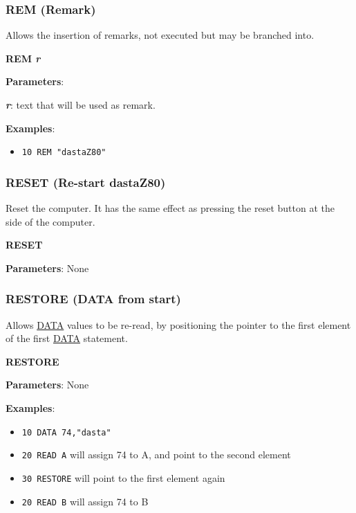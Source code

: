     \subsubsection{{REM (Remark)}}
    \label{msbasic:lang:rem}
    Allows the insertion of remarks, not executed but may be branched into.

    \hspace{1.9cm}\textbf{REM \textit{r}}

    \textbf{Parameters}:

    \hspace{1cm}\textbf{\textit{r}}: text that will be used as remark.

    \textbf{Examples}:
    \begin{itemize}
        \item \texttt{10 REM "dastaZ80"}
    \end{itemize}

    \subsubsection{{RESET (Re-start dastaZ80)}}
    \label{msbasic:lang:reset}
    Reset the computer. It has the same effect as pressing the reset button at
    the side of the computer.

    \hspace{1.9cm}\textbf{RESET}

    \textbf{Parameters}: None

    \subsubsection{{RESTORE (DATA from start)}}
    \label{msbasic:lang:restore}
    Allows \hyperref[msbasic:lang:data]{DATA} values to be re-read, by
    positioning the pointer to the first element of the first
    \hyperref[msbasic:lang:data]{DATA} statement.

    \hspace{1.9cm}\textbf{RESTORE}

    \textbf{Parameters}: None

    \textbf{Examples}:
    \begin{itemize}
        \item \texttt{10 DATA 74,"dasta"}
        \item \texttt{20 READ A} will assign 74 to A, and point to the second
        element
        \item \texttt{30 RESTORE} will point to the first element again
        \item \texttt{20 READ B} will assign 74 to B
    \end{itemize}

